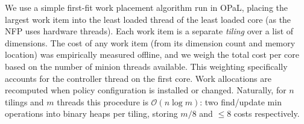 \documentclass[
conference
,10pt
]{IEEEtran}
\newcommand{\approachshort}{OPaL}
\begin{document}
We use a simple first-fit work placement algorithm run in \approachshort{}, placing the largest work item into the least loaded thread of the least loaded core (as the NFP uses hardware threads).
Each work item is a separate \emph{tiling} over a list of dimensions.
The cost of any work item (from its dimension count and memory location) was empirically measured offline, and we weigh the total cost per core based on the number of minion threads available.
This weighting specifically accounts for the controller thread on the first core.
Work allocations are recomputed when policy configuration is installed or changed.
Naturally, for $n$ tilings and $m$ threads this procedure is $\mathcal{O}{\left(n\log{m}\right)}$: two find/update min operations into binary heaps per tiling, storing $m/8$ and $\le8$ costs respectively.

%

%
%
%
\end{document}

